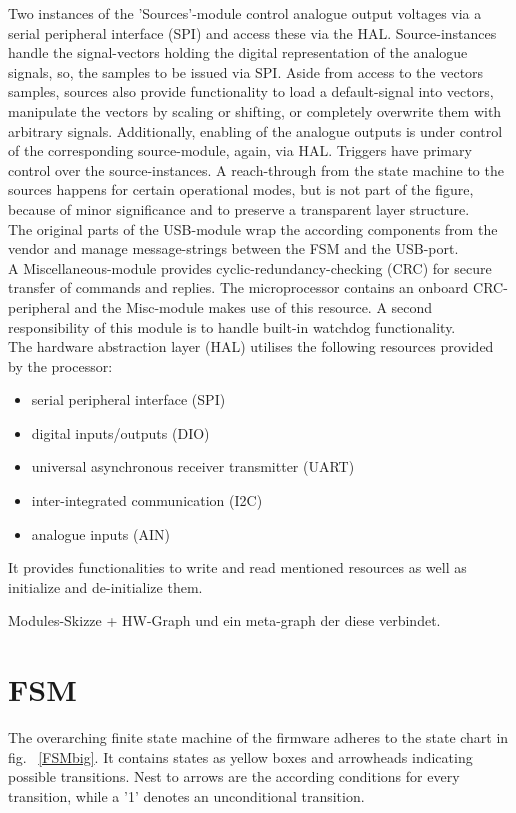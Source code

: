 \documentclass[master,english,smartquotes,apa]{hgbthesis}
\begin{document}
		Two instances of the 'Sources'-module control analogue output voltages via a serial peripheral interface (SPI) and access these via the HAL. Source-instances handle the signal-vectors holding the digital representation of the analogue signals, so, the samples to be issued via SPI. Aside from access to the vectors samples, sources also provide functionality to load a default-signal into vectors, manipulate the vectors by scaling or shifting, or completely overwrite them with arbitrary signals. Additionally, enabling of the analogue outputs is under control of the corresponding source-module, again, via HAL. Triggers have primary control over the source-instances. A reach-through from the state machine to the sources happens for certain operational modes, but is not part of the figure, because of minor significance and to preserve a transparent layer structure. \\
		
		The original parts of the USB-module wrap the according components from the vendor and manage message-strings between the FSM and the USB-port. \\
		
		A Miscellaneous-module provides cyclic-redundancy-checking (CRC) for secure transfer of commands and replies. The microprocessor contains an onboard CRC-peripheral and the Misc-module makes use of this resource. A second responsibility of this module is to handle built-in watchdog functionality. \\
		
		The hardware abstraction layer (HAL) utilises the following resources provided by the processor:
		\begin{itemize} \setlength\itemsep{1px}
		\item serial peripheral interface (SPI)
		\item digital inputs/outputs (DIO)
		\item universal asynchronous receiver transmitter (UART)
		\item inter-integrated communication (I2C)
		\item analogue inputs (AIN)
		\end{itemize}
		It provides functionalities to write and read mentioned resources as well as initialize and de-initialize them. 
		
			Modules-Skizze + HW-Graph und ein meta-graph der diese verbindet.

		\section{FSM}
		The overarching finite state machine of the firmware adheres to the state chart in fig.	~\ref{FSMbig}. It contains states as yellow boxes and arrowheads indicating possible transitions. Nest to arrows are the according conditions for every transition, while a '1' denotes an unconditional transition. \\
		
\end{document}
